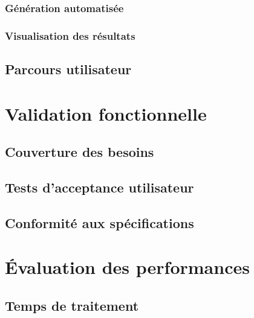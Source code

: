 \subsubsection{Génération automatisée}


\subsubsection{Visualisation des résultats}


\subsection{Parcours utilisateur}


\section{Validation fonctionnelle}


\subsection{Couverture des besoins}


\subsection{Tests d'acceptance utilisateur}


\subsection{Conformité aux spécifications}


\section{Évaluation des performances}


\subsection{Temps de traitement}

